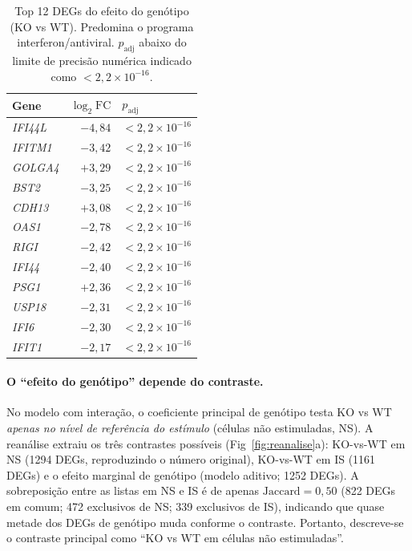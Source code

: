 \documentclass[10pt,letterpaper]{article}
\newcommand{\gene}[1]{\textit{#1}}
\newcommand{\logfc}{\ensuremath{\log_2\mathrm{FC}}}
\begin{document}
\begin{table}[htbp]
\centering
\caption{Top 12 DEGs do efeito do genótipo (KO vs WT). Predomina o programa
interferon/antiviral. \(p_{\mathrm{adj}}\) abaixo do limite de precisão numérica
indicado como \(< 2{,}2\times10^{-16}\).}
\label{tab:topdeg}
\begin{tabular}{lrl}
\toprule
\textbf{Gene} & \textbf{\logfc{}} & \textbf{\(p_{\mathrm{adj}}\)} \\
\midrule
\gene{IFI44L} & \(-4{,}84\) & \(< 2{,}2\times10^{-16}\) \\
\gene{IFITM1} & \(-3{,}42\) & \(< 2{,}2\times10^{-16}\) \\
\gene{GOLGA4} & \(+3{,}29\) & \(< 2{,}2\times10^{-16}\) \\
\gene{BST2}   & \(-3{,}25\) & \(< 2{,}2\times10^{-16}\) \\
\gene{CDH13}  & \(+3{,}08\) & \(< 2{,}2\times10^{-16}\) \\
\gene{OAS1}   & \(-2{,}78\) & \(< 2{,}2\times10^{-16}\) \\
\gene{RIGI}   & \(-2{,}42\) & \(< 2{,}2\times10^{-16}\) \\
\gene{IFI44}  & \(-2{,}40\) & \(< 2{,}2\times10^{-16}\) \\
\gene{PSG1}   & \(+2{,}36\) & \(< 2{,}2\times10^{-16}\) \\
\gene{USP18}  & \(-2{,}31\) & \(< 2{,}2\times10^{-16}\) \\
\gene{IFI6}   & \(-2{,}30\) & \(< 2{,}2\times10^{-16}\) \\
\gene{IFIT1}  & \(-2{,}17\) & \(< 2{,}2\times10^{-16}\) \\
\bottomrule
\end{tabular}
\end{table}

\paragraph{O ``efeito do genótipo'' depende do contraste.} No modelo com
interação, o coeficiente principal de genótipo testa KO vs WT \emph{apenas no
nível de referência do estímulo} (células não estimuladas, NS). A reanálise
extraiu os três contrastes possíveis (Fig~\ref{fig:reanalise}a): KO-vs-WT em
NS (\num{1294} DEGs, reproduzindo o número original), KO-vs-WT em IS
(\num{1161} DEGs) e o efeito marginal de genótipo (modelo aditivo; \num{1252}
DEGs). A sobreposição entre as listas em NS e IS é de apenas
\(\text{Jaccard} = 0{,}50\) (822 DEGs em comum; 472 exclusivos de NS; 339
exclusivos de IS), indicando que quase metade dos DEGs de genótipo muda conforme
o contraste. Portanto, descreve-se o contraste principal como
``KO vs WT em células não estimuladas''.
\end{document}
